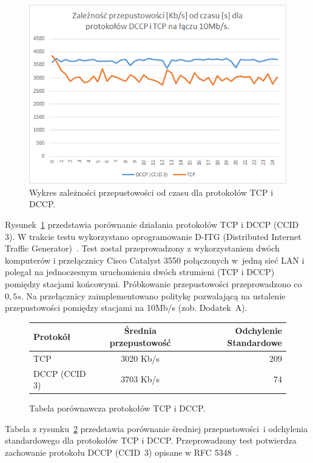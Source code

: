 \begin{figure}[h!]
	\centering
		\includegraphics{TCP_DCCP}
	\caption{Wykres zależności przepustowości od czasu dla protokołów TCP i DCCP.}
	\label{TCP_DCCP}
\end{figure}

Rysunek~\ref{TCP_DCCP} przedstawia porównanie działania protokołów TCP i DCCP (CCID 3). W trakcie testu wykorzystano oprogramowanie D-ITG (Distributed Internet Traffic Generator)~\cite{D-ITG}. Test został przeprowadzony z wykorzystaniem dwóch komputerów i przełącznicy Cisco Catalyst 3550 połączonych w~jedną sieć LAN i polegał na jednoczesnym uruchomieniu dwóch strumieni (TCP i DCCP) pomiędzy stacjami końcowymi. Próbkowanie przepustowości przeprowadzono co $0,5s$. Na przełącznicy zaimplementowano politykę pozwalającą na ustalenie przepustowości pomiędzy stacjami na 10Mb/s (zob. Dodatek~A).

\begin{figure}
	\centering
	\begin{tabular}{ l | c | r }
  		Protokół & Średnia przepustowość & Odchylenie Standardowe \\
  		\hline
  		TCP & 3020 Kb/s & 209 \\
  		DCCP (CCID 3) & 3703 Kb/s & 74 \\
	\end{tabular}
	\caption{Tabela porównawcza protokołów TCP i DCCP.}
	\label{TCP_DCCP_table}
\end{figure}

Tabela z rysunku~\ref{TCP_DCCP_table} przedstawia porównanie średniej przepustowości~i odchylenia standardowego dla protokołów TCP i DCCP. Przeprowadzony test potwierdza zachowanie protokołu DCCP (CCID~3) opisane w RFC 5348~\cite{RFC5348}. 

